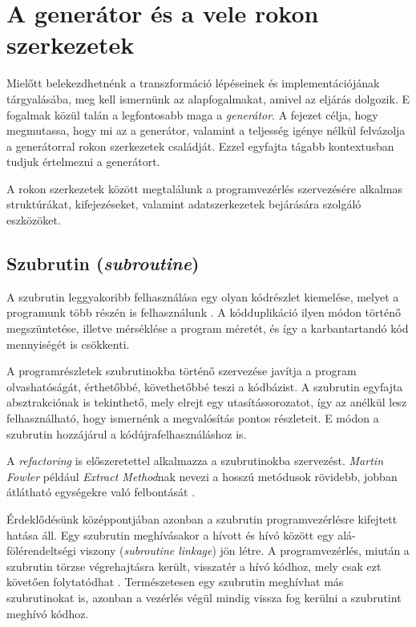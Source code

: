 \chapter{A generátor és a vele rokon szerkezetek}

Mielőtt belekezdhetnénk a transzformáció lépéseinek és implementációjának tárgyalásába, meg kell ismernünk az alapfogalmakat, amivel az eljárás dolgozik. E fogalmak közül talán a legfontosabb maga a \textit{generátor}. A fejezet célja, hogy megmutassa, hogy mi az a generátor, valamint a teljesség igénye nélkül felvázolja a generátorral rokon szerkezetek családját. Ezzel egyfajta tágabb kontextusban tudjuk értelmezni a generátort.

A rokon szerkezetek között megtalálunk a programvezérlés szervezésére alkalmas struktúrákat, kifejezéseket, valamint adatszerkezetek bejárására szolgáló eszközöket.

\section{Szubrutin (\textit{subroutine})}

A szubrutin leggyakoribb felhasználása egy olyan kódrészlet kiemelése, melyet a programunk több részén is felhasználunk \cite{TAoCPVol1}. A kódduplikáció ilyen módon történő megszüntetése, illetve mérséklése a program méretét, és így a karbantartandó kód mennyiségét is csökkenti. 

A programrészletek szubrutinokba történő szervezése javítja a program olvashatóságát, érthetőbbé, követhetőbbé teszi a kódbázist. A szubrutin egyfajta absztrakciónak is tekinthető, mely elrejt egy utasítássorozatot, így az anélkül lesz felhasználható, hogy ismernénk a megvalósítás pontos részleteit. E módon a szubrutin hozzájárul a kódújrafelhasználáshoz is.

A \textit{refactoring} is előszeretettel alkalmazza a szubrutinokba szervezést. \textit{Martin Fowler} például \textit{Extract Method}nak nevezi a hosszú metódusok rövidebb, jobban átlátható egységekre való felbontását \cite{FowlerRefactoring}.

Érdeklődésünk középpontjában azonban a szubrutin programvezérlésre kifejtett hatása áll. Egy szubrutin meghívásakor a hívott és hívó között egy alá-fölérendeltségi viszony (\textit{subroutine linkage}) jön létre. A programvezérlés, miután a szubrutin törzse végrehajtásra került, visszatér a hívó kódhoz, mely csak ezt követően folytatódhat \cite{ScottProgLangPrag}. Természetesen egy szubrutin meghívhat más szubrutinokat is, azonban a vezérlés végül mindig vissza fog kerülni a szubrutint meghívó kódhoz.

